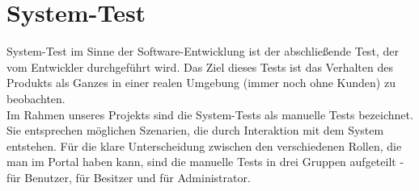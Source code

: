 \documentclass[parskip=full,11pt]{scrartcl}
\begin{document}
\newpage
\section{System-Test} \label{systemtest}
System-Test im Sinne der Software-Entwicklung ist der abschließende Test, der vom Entwickler durchgeführt wird. Das Ziel dieses Tests ist das Verhalten des Produkts als Ganzes in einer realen Umgebung (immer noch ohne Kunden) zu beobachten.\\
Im Rahmen unseres Projekts sind die System-Tests als manuelle Tests bezeichnet. Sie entsprechen möglichen Szenarien, die durch Interaktion mit dem System entstehen. Für die klare Unterscheidung zwischen den verschiedenen Rollen, die man im Portal haben kann, sind die manuelle Tests in drei Gruppen aufgeteilt - für Benutzer, für Besitzer und für Administrator.
\end{document}
